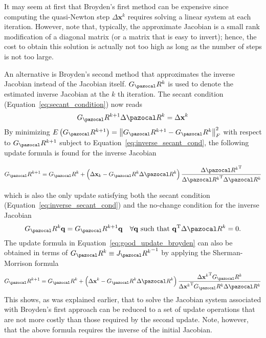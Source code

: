 It may seem at first that Broyden's first method can be expensive since computing the quasi-Newton step \(\Delta \mathbf x^{k}\) requires solving a linear system at each iteration.
However, note that, typically, the approximate Jacobian is a small rank modification of a diagonal matrix (or a matrix that is easy to invert); hence, the cost to obtain this solution is actually not too high as long as the number of steps is not too large.

An alternative is Broyden's second method that approximates the inverse Jacobian instead of the Jacobian itself.
\(G_\pazocal R^{k}\) is used to denote the estimated inverse Jacobian at the \(k\) th iteration.
The secant condition (Equation~\eqref{eq:secant_condition}) now reads
\begin{equation} \label{eq:inverse_secant_cond}
G_\pazocal R^{k+1} \Delta \pazocal R^{k}=\Delta \mathbf x^{k}
\end{equation}
By minimizing \(E\left(G_\pazocal R^{k+1}\right)=\left\|G_\pazocal R^{k+1}-G_\pazocal R^{k}\right\|_{F}^{2}\) with respect to \(G_\pazocal R^{k+1}\) subject to Equation~\eqref{eq:inverse_secant_cond}, the following update formula is found for the inverse Jacobian
\begin{highlight}
  \begin{equation} \label{eq:bad_update_broyden}
  G_\pazocal R^{k+1}=G_\pazocal R^{k}+\left(\Delta \mathbf x_{k}-G_\pazocal R^{k} \Delta \pazocal R^{k}\right) \frac{\Delta {\pazocal R^{k}}^{\mathrm{T}}}{\Delta {\pazocal R^{k}}^{\mathrm{T}} \Delta \pazocal R^{k}}
  \end{equation}
\end{highlight}
which is also the only update satisfying both the secant condition (Equation~\eqref{eq:inverse_secant_cond}) and the no-change condition for the inverse Jacobian
\begin{equation}
  G_\pazocal R^{k} \mathbf q=G_\pazocal R^{k+1} \mathbf q \quad \forall \mathbf q \text { such that } \mathbf q^{\mathrm{T}} \Delta \pazocal R^{k}=0.
\end{equation}
The update formula in Equation~\eqref{eq:good_update_broyden} can also be obtained in terms of \(G_\pazocal R^{k} \equiv {J_\pazocal R^{k}}^{-1}\) by applying the Sherman-Morrison formula
\begin{equation}
G_\pazocal R^{k+1}=G_\pazocal R^{k}+\left(\Delta \mathbf x^{k}-G_\pazocal R^{k} \Delta \pazocal R^{k}\right) \frac{\Delta {\mathbf x^{k}}^{\mathrm{T}} G_\pazocal R^{k}}{\Delta {\mathbf x^{k}}^{\mathrm{T}} G_\pazocal R^{k} \Delta \pazocal R^{k}}
\end{equation}
This shows, as was explained earlier, that to solve the Jacobian system associated with Broyden's first approach can be reduced to a set of update operations that are not more costly than those required by the second update.
Note, however, that the above formula requires the inverse of the initial Jacobian.

